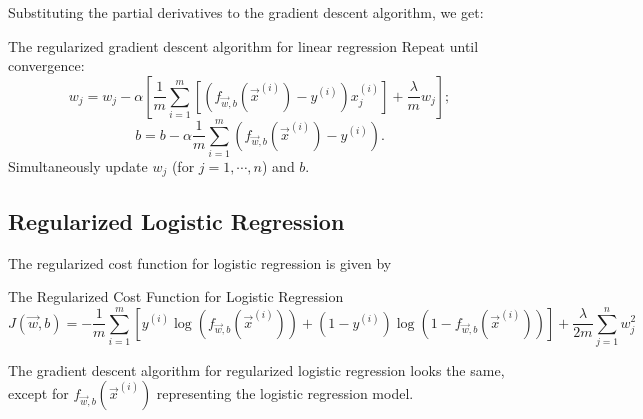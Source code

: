 \documentclass[12pt,a4paper]{article}
\begin{document}
Substituting the partial derivatives to the gradient descent algorithm, we get: 
\begin{rmkbox}{The regularized gradient descent algorithm for linear regression}
	Repeat until convergence: 
	$$w_j=w_j-\alpha\left[\frac{1}{m}\sum_{i=1}^m\left[(f_{\vec{w},b}(\vec{x}^{(i)})-y^{(i)})x_j^{(i)}\right]+\frac{\lambda}{m}w_j\right];$$
	$$b=b-\alpha\frac{1}{m}\sum_{i=1}^m\left(f_{\vec{w},b}(\vec{x}^{(i)})-y^{(i)}\right).$$
	Simultaneously update $w_j$ (for $j=1,\cdots,n$) and $b$.
\end{rmkbox}

\subsection{Regularized Logistic Regression}
\quad The regularized cost function for logistic regression is given by 
\begin{thmbox}{The Regularized Cost Function for Logistic Regression}
	$$J(\vec{w},b)=-\frac{1}{m}\sum_{i=1}^m\left[y^{(i)}\log\left(f_{\vec{w},b}(\vec{x}^{(i)})\right)+(1-y^{(i)})\log\left(1-f_{\vec{w},b}(\vec{x}^{(i)})\right)\right]+\frac{\lambda}{2m}\sum_{j=1}^nw_j^2$$
\end{thmbox}

The gradient descent algorithm for regularized logistic regression looks the same, except for $f_{\vec{w},b}(\vec{x}^{(i)})$ representing the logistic regression model. 
\end{document}
